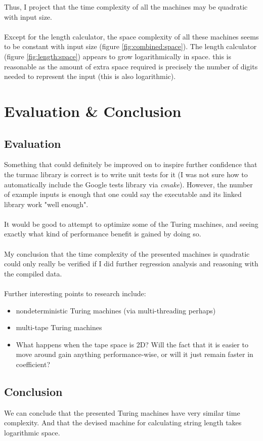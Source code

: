 \documentclass[]{article}
\begin{document}
Thus, I project that the time complexity of all the machines may be quadratic with input size.
\\\\
Except for the length calculator, the space complexity of all these machines seems to be constant with input size (figure \ref{fig:combined:space}). The length calculator (figure \ref{fig:length:space}) appears to grow logarithmically in space. this is reasonable as the amount of extra space required is precisely the number of digits needed to represent the input (this is also logarithmic).

\section{Evaluation \& Conclusion}
\subsection{Evaluation}
Something that could definitely be improved on to inspire further confidence that the turmac library is correct is to write unit tests for it (I was not sure how to automatically include the Google tests library via \emph{cmake}). However, the number of example inputs is enough that one could say the executable and its linked library work "well enough".
\\\\
It would be good to attempt to optimize some of the Turing machines, and seeing exactly what kind of performance benefit is gained by doing so.
\\\\
My conclusion that the time complexity of the presented machines is quadratic could only really be verified if I did further regression analysis and reasoning with the compiled data.
\\\\
Further interesting points to research include:
\begin{itemize}
	\item nondeterministic Turing machines (via multi-threading perhaps)
	\item multi-tape Turing machines
	\item What happens when the tape space is 2D? Will the fact that it is easier to move around gain anything performance-wise, or will it just remain faster in coefficient?
\end{itemize}
\subsection{Conclusion}
We can conclude that the presented Turing machines have very similar time complexity. And that the devised machine for calculating string length takes logarithmic space.
\end{document}
